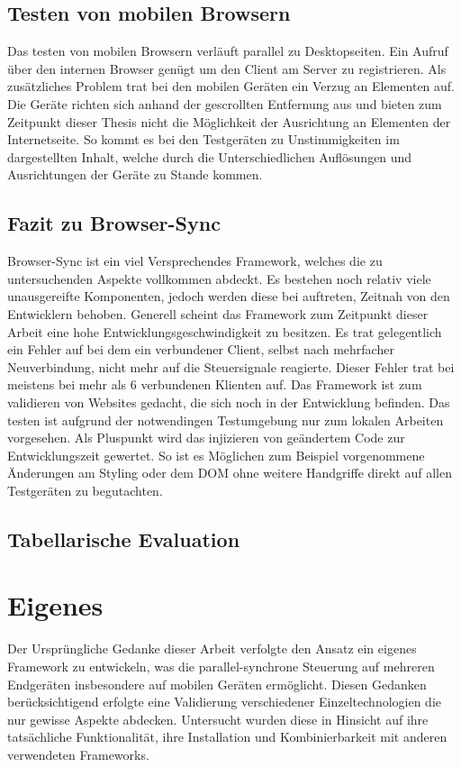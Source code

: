 	\subsection{Testen von mobilen Browsern}
	Das testen von mobilen Browsern verläuft parallel zu Desktopseiten. Ein Aufruf über den internen Browser genügt um den Client am Server zu registrieren. Als zusätzliches Problem trat bei den mobilen Geräten ein Verzug an Elementen auf. Die Geräte richten sich anhand der gescrollten Entfernung aus und bieten zum Zeitpunkt dieser Thesis nicht die Möglichkeit der Ausrichtung an Elementen der Internetseite. So kommt es bei den Testgeräten zu Unstimmigkeiten im dargestellten Inhalt, welche durch die Unterschiedlichen Auflösungen und Ausrichtungen der Geräte zu Stande kommen.
	
	\subsection{Fazit zu Browser-Sync}
	Browser-Sync ist ein viel Versprechendes Framework, welches die zu untersuchenden Aspekte vollkommen abdeckt. Es bestehen noch relativ viele unausgereifte Komponenten, jedoch werden diese bei auftreten, Zeitnah von den Entwicklern behoben. Generell scheint das Framework zum Zeitpunkt dieser Arbeit eine hohe Entwicklungsgeschwindigkeit zu besitzen. Es trat gelegentlich ein Fehler auf bei dem ein verbundener Client, selbst nach mehrfacher Neuverbindung, nicht mehr auf die Steuersignale reagierte. Dieser Fehler trat bei meistens bei mehr als 6 verbundenen Klienten auf. Das Framework ist zum validieren von Websites gedacht, die sich noch in der Entwicklung befinden. Das testen ist aufgrund der notwendingen Testumgebung nur zum lokalen Arbeiten vorgesehen. Als Pluspunkt wird das injizieren von geändertem Code zur Entwicklungszeit gewertet. So ist es Möglichen zum Beispiel vorgenommene Änderungen am Styling oder dem DOM ohne weitere Handgriffe direkt auf allen Testgeräten zu begutachten.
	
	\subsection{Tabellarische Evaluation}
	
	
	\section{Eigenes }
	Der Ursprüngliche Gedanke dieser Arbeit verfolgte den Ansatz ein eigenes Framework zu entwickeln, was die parallel-synchrone Steuerung auf mehreren Endgeräten insbesondere auf mobilen Geräten ermöglicht. Diesen Gedanken berücksichtigend erfolgte eine Validierung verschiedener Einzeltechnologien die nur gewisse Aspekte abdecken. Untersucht wurden diese in Hinsicht auf ihre tatsächliche Funktionalität, ihre Installation und Kombinierbarkeit mit anderen verwendeten Frameworks.
	
